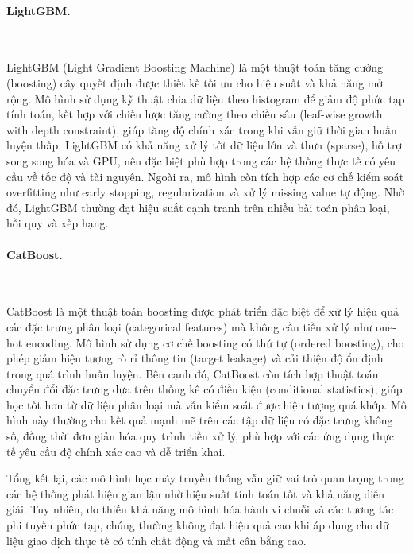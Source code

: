 \paragraph{LightGBM.}~

\vspace{0.5em}

LightGBM (Light Gradient Boosting Machine) là một thuật toán tăng cường (boosting) cây quyết định được thiết kế tối ưu cho hiệu suất và khả năng mở rộng. Mô hình sử dụng kỹ thuật chia dữ liệu theo histogram để giảm độ phức tạp tính toán, kết hợp với chiến lược tăng cường theo chiều sâu (leaf-wise growth with depth constraint), giúp tăng độ chính xác trong khi vẫn giữ thời gian huấn luyện thấp. LightGBM có khả năng xử lý tốt dữ liệu lớn và thưa (sparse), hỗ trợ song song hóa và GPU, nên đặc biệt phù hợp trong các hệ thống thực tế có yêu cầu về tốc độ và tài nguyên. Ngoài ra, mô hình còn tích hợp các cơ chế kiểm soát overfitting như early stopping, regularization và xử lý missing value tự động. Nhờ đó, LightGBM thường đạt hiệu suất cạnh tranh trên nhiều bài toán phân loại, hồi quy và xếp hạng.

\vspace{0.5em}

\paragraph{CatBoost.}~

\vspace{0.5em}

CatBoost là một thuật toán boosting được phát triển đặc biệt để xử lý hiệu quả các đặc trưng phân loại (categorical features) mà không cần tiền xử lý như one-hot encoding. Mô hình sử dụng cơ chế boosting có thứ tự (ordered boosting), cho phép giảm hiện tượng rò rỉ thông tin (target leakage) và cải thiện độ ổn định trong quá trình huấn luyện. Bên cạnh đó, CatBoost còn tích hợp thuật toán chuyển đổi đặc trưng dựa trên thống kê có điều kiện (conditional statistics), giúp học tốt hơn từ dữ liệu phân loại mà vẫn kiểm soát được hiện tượng quá khớp. Mô hình này thường cho kết quả mạnh mẽ trên các tập dữ liệu có đặc trưng không số, đồng thời đơn giản hóa quy trình tiền xử lý, phù hợp với các ứng dụng thực tế yêu cầu độ chính xác cao và dễ triển khai.

\vspace{0.5em}

Tổng kết lại, các mô hình học máy truyền thống vẫn giữ vai trò quan trọng trong các hệ thống phát hiện gian lận nhờ hiệu suất tính toán tốt và khả năng diễn giải. Tuy nhiên, do thiếu khả năng mô hình hóa hành vi chuỗi và các tương tác phi tuyến phức tạp, chúng thường không đạt hiệu quả cao khi áp dụng cho dữ liệu giao dịch thực tế có tính chất động và mất cân bằng cao.

